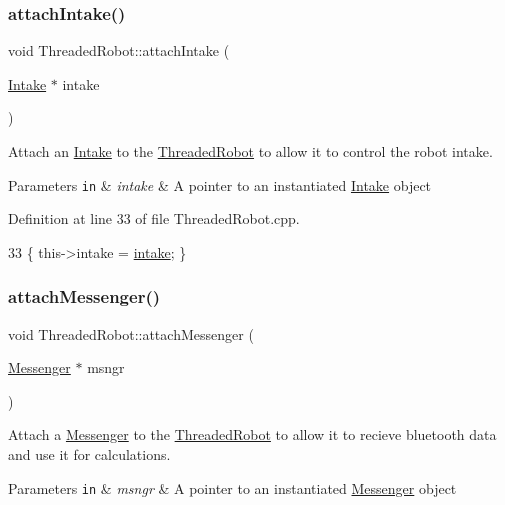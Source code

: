 \subsubsection{\texorpdfstring{attach\+Intake()}{attachIntake()}}
{\footnotesize\ttfamily void Threaded\+Robot\+::attach\+Intake (\begin{DoxyParamCaption}\item[{\hyperlink{class_intake}{Intake} $\ast$}]{intake }\end{DoxyParamCaption})}



Attach an \hyperlink{class_intake}{Intake} to the \hyperlink{class_threaded_robot}{Threaded\+Robot} to allow it to control the robot intake. 


\begin{DoxyParams}[1]{Parameters}
\mbox{\tt in}  & {\em intake} & A pointer to an instantiated \hyperlink{class_intake}{Intake} object \\
\hline
\end{DoxyParams}


Definition at line 33 of file Threaded\+Robot.\+cpp.


\begin{DoxyCode}
33 \{ this->intake = \hyperlink{class_threaded_robot_ac4e32d1373e0d8a887c29378c002783f}{intake}; \}
\end{DoxyCode}
\mbox{\label{class_threaded_robot_afc27bf260266c249fc7ce2895a20882f}} 
\subsubsection{\texorpdfstring{attach\+Messenger()}{attachMessenger()}}
{\footnotesize\ttfamily void Threaded\+Robot\+::attach\+Messenger (\begin{DoxyParamCaption}\item[{\hyperlink{class_messenger}{Messenger} $\ast$}]{msngr }\end{DoxyParamCaption})}



Attach a \hyperlink{class_messenger}{Messenger} to the \hyperlink{class_threaded_robot}{Threaded\+Robot} to allow it to recieve bluetooth data and use it for calculations. 


\begin{DoxyParams}[1]{Parameters}
\mbox{\tt in}  & {\em msngr} & A pointer to an instantiated \hyperlink{class_messenger}{Messenger} object \\
\hline
\end{DoxyParams}


